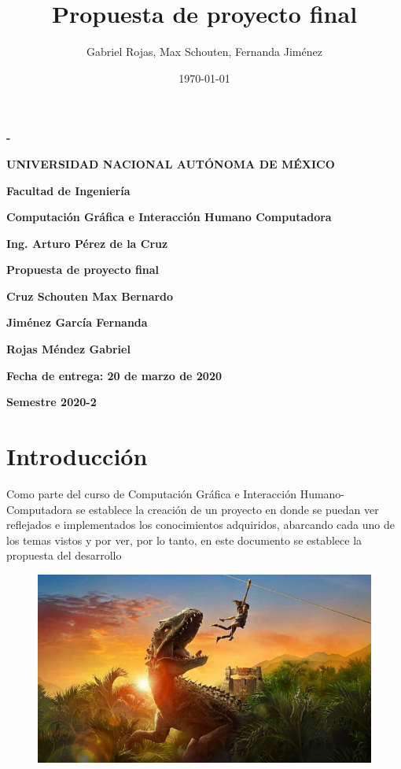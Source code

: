 \documentclass[12pt]{article} %
\title{Propuesta de proyecto final}
\author{Gabriel Rojas, Max Schouten, Fernanda Jiménez}
\date{\today}
\begin{document}
	\begin{titlepage}
		\thispagestyle{fancy}
		\centering
		{\bfseries - \par}
		\vspace{1cm}
		{\bfseries\LARGE UNIVERSIDAD NACIONAL AUTÓNOMA DE MÉXICO \par}
		\vspace{1cm}
		{\bfseries\LARGE Facultad de Ingeniería \par}
		\vspace{1cm}
		{\bfseries\LARGE Computación Gráfica e Interacción Humano Computadora \par}
		\vspace{1cm}
		{\bfseries\LARGE Ing. Arturo Pérez de la Cruz \par}
		\vspace{1cm}
		{\bfseries\LARGE Propuesta de proyecto final \par}
		\vspace{1cm}
		{\bfseries\LARGE Cruz Schouten Max Bernardo \par}
		{\bfseries\LARGE Jiménez García Fernanda \par}
		{\bfseries\LARGE Rojas Méndez Gabriel \par}
		\vspace{1cm}
		{\bfseries\LARGE Fecha de entrega: 20 de marzo de 2020 \par}
		\vspace{1cm}
		{\bfseries\LARGE Semestre 2020-2 \par}
	\end{titlepage}

	\newpage
	\section{Introducción}
	Como parte del curso de Computación Gráfica e Interacción Humano-Computadora se establece la creación de un proyecto en donde se puedan ver reflejados e implementados los conocimientos adquiridos, abarcando cada uno de los temas vistos y por ver, por lo tanto, en este documento se establece la propuesta del desarrollo
	
	 \begin{figure}[h]
	 	\centering
	 	\includegraphics[scale=0.8]{intro.png}
	 \end{figure}
 	
\end{document}
